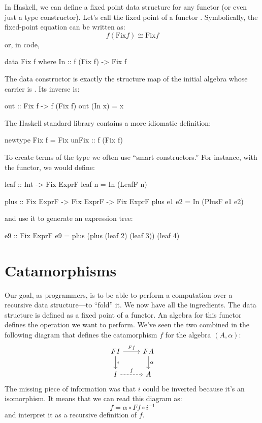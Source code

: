 \documentclass[DaoFP]{subfiles}
\begin{document}
In Haskell, we can define a fixed point data structure for any functor (or even just a type constructor). Let's call  the fixed point of a functor . Symbolically, the fixed-point equation can be written as:
\[f ( \text{Fix} f) \cong  \text{Fix} f \]
or, in code,
\begin{haskell}
data Fix f where
  In :: f (Fix f) -> Fix f
\end{haskell}
The data constructor  is exactly the structure map of the initial algebra whose carrier is . Its inverse is:
\begin{haskell}
out :: Fix f -> f (Fix f)
out (In x) = x
\end{haskell}
The Haskell standard library contains a more idiomatic definition:
\begin{haskell}
newtype Fix f = Fix { unFix :: f (Fix f) }
\end{haskell}

To create terms of the type  we often use ``smart constructors.'' For instance, with the  functor, we would define:
\begin{haskell}
leaf :: Int -> Fix ExprF
leaf n = In (LeafF n)

plus :: Fix ExprF -> Fix ExprF -> Fix ExprF
plus e1 e2 = In (PlusF e1 e2)
\end{haskell}
and use it to generate an expression tree:
\begin{haskell}
e9 :: Fix ExprF
e9 = plus (plus (leaf 2) (leaf 3)) (leaf 4)
\end{haskell}

\section{Catamorphisms}

Our goal, as programmers, is to be able to perform a computation over a recursive data structure---to ``fold'' it. We now have all the ingredients. The data structure is defined as a fixed point of a functor. An algebra for this functor defines the operation we want to perform. We've seen the two combined in the following diagram that defines the catamorphism $f$ for the algebra $(A, \alpha)$:
\[
 \begin{tikzcd}
 F I 
 \arrow[r, "F f"]
 \arrow[d, "i"]
 & F A
\arrow[d, "\alpha"]
 \\
 I
 \arrow[r, dashed, "f"]
 & A
  \end{tikzcd}
\]
The missing piece of information was that $i$ could be inverted because it's an isomorphism. It means that we can read this diagram as:
\[ f = \alpha \circ F f \circ i^{-1} \]
and interpret it as a recursive definition of $f$. 
\end{document}
